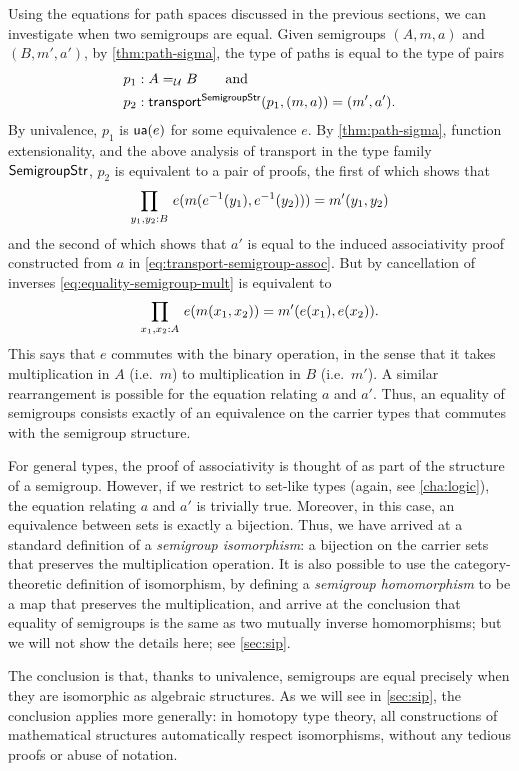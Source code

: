 Using the equations for path spaces discussed in the previous sections,
we can investigate when two semigroups are equal. Given semigroups
$(A,m,a)$ and $(B,m',a')$, by \cref{thm:path-sigma}, the type of paths
is equal to the type of pairs
\begin{align*}
p_1 &: A =_{\mathcal{U}} B \qquad\text{and}\\
p_2 &: \mathsf{transport}^{\mathsf{SemigroupStr}}(p_1,(m,a)) = {(m',a')}.
\end{align*}
By univalence, $p_1$ is $\mathsf{ua}(e)$ for some equivalence $e$. By
\cref{thm:path-sigma}, function extensionality, and the above analysis of
transport in the type family $\mathsf{SemigroupStr}$, $p_2$ is equivalent to a pair
of proofs, the first of which shows that
\begin{equation*} \label{eq:equality-semigroup-mult}
\prd{y_1,y_2:B} e(m(\opp{e}(y_1), \opp{e}(y_2))) = m'(y_1,y_2)
\end{equation*}
and the second of which shows that $a'$ is equal to the induced
associativity proof constructed from $a$ in
\eqref{eq:transport-semigroup-assoc}.  But by cancellation of inverses
\eqref{eq:equality-semigroup-mult} is equivalent to
\[
\prd{x_1,x_2:A} e(m(x_1, x_2)) = m'(e(x_1),e(x_2)).
\]
This says that $e$ commutes with the binary operation, in the sense
that it takes multiplication in $A$ (i.e.\ $m$) to multiplication in $B$
(i.e.\ $m'$).  A similar rearrangement is possible for the equation relating
$a$ and $a'$.  Thus, an equality of semigroups consists exactly of an
equivalence on the carrier types that commutes with the semigroup
structure.

For general types, the proof of associativity is thought of as part of
the structure of a semigroup.  However, if we restrict to set-like types
(again, see \cref{cha:logic}), the
equation relating $a$ and $a'$ is trivially true.  Moreover, in this
case, an equivalence between sets is exactly a bijection.  Thus, we have
arrived at a standard definition of a \emph{semigroup isomorphism}: a
bijection on the carrier sets that preserves the multiplication
operation.  It is also possible to use the category-theoretic definition
of isomorphism, by defining a \emph{semigroup homomorphism} to be a map
that preserves the multiplication, and arrive at the conclusion that equality of
semigroups is the same as two mutually inverse homomorphisms; but we
will not show the details here; see \cref{sec:sip}.

The conclusion is that, thanks to univalence, semigroups are equal
precisely when they are isomorphic as algebraic structures. As we will see in \cref{sec:sip}, the
conclusion applies more generally: in homotopy type theory, all constructions of
mathematical structures automatically respect isomorphisms, without any
tedious proofs or abuse of notation.